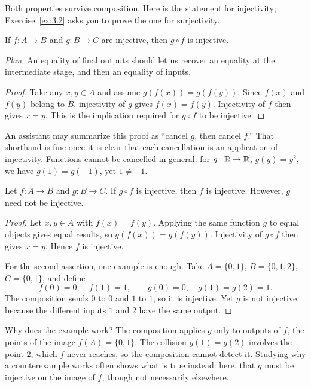 Both properties survive composition. Here is the statement for injectivity; Exercise~\ref{ex:3.2} asks you to prove the one for surjectivity.

\par\noindent\begin{minipage}{\linewidth}
\begin{theorem}\label{thm:injcomp}
If $f:A\to B$ and $g:B\to C$ are injective, then $g\circ f$ is injective.
\end{theorem}
\end{minipage}\par

\noindent\textit{Plan.} An equality of final outputs should let us recover an equality at the intermediate stage, and then an equality of inputs.
\begin{proof}
Take any $x,y\in A$ and assume $g(f(x))=g(f(y))$. Since $f(x)$ and $f(y)$ belong to $B$, injectivity of $g$ gives $f(x)=f(y)$. Injectivity of $f$ then gives $x=y$. This is the implication required for $g\circ f$ to be injective.
\end{proof}

An assistant may summarize this proof as ``cancel $g$, then cancel $f$.'' That shorthand is fine once it is clear that each cancellation is an application of injectivity. Functions cannot be cancelled in general: for $g:\mathbb R\to\mathbb R$, $g(y)=y^2$, we have $g(1)=g(-1)$, yet $1\ne-1$.

\par\noindent\begin{minipage}{\linewidth}
\begin{proposition}\label{thm:compconverse}
Let $f:A\to B$ and $g:B\to C$. If $g\circ f$ is injective, then $f$ is injective. However, $g$ need not be injective.
\end{proposition}
\end{minipage}\par

\begin{proof}
Let $x,y\in A$ with $f(x)=f(y)$. Applying the same function $g$ to equal objects gives equal results, so $g(f(x))=g(f(y))$. Injectivity of $g\circ f$ then gives $x=y$. Hence $f$ is injective.

For the second assertion, one example is enough. Take $A=\{0,1\}$, $B=\{0,1,2\}$, $C=\{0,1\}$, and define
\[
f(0)=0,\quad f(1)=1,\qquad g(0)=0,\quad g(1)=g(2)=1.
\]
The composition sends $0$ to $0$ and $1$ to $1$, so it is injective. Yet $g$ is not injective, because the different inputs $1$ and $2$ have the same output.
\end{proof}
Why does the example work? The composition applies $g$ only to outputs of $f$, the points of the image $f(A)=\{0,1\}$. The collision $g(1)=g(2)$ involves the point $2$, which $f$ never reaches, so the composition cannot detect it. Studying why a counterexample works often shows what is true instead: here, that $g$ must be injective on the image of $f$, though not necessarily elsewhere.

